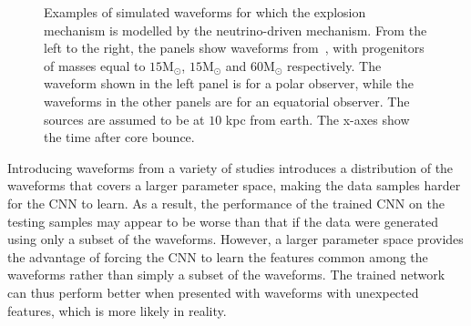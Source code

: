 \documentclass[aps,twocolumn,showpacs,groupedaddress, nofootinbib]{revtex4}  %
\begin{document}
%
%
\begin{figure}
     \begin{center}
        \quad
        \quad
    \end{center}
    \caption{Examples of simulated waveforms for which the explosion mechanism is
modelled by the neutrino-driven mechanism. From the left to the right, the
panels show waveforms from~\cite{10.1093mnrasstz990, 
radice2019characterizing, yakunin2017gravitational}, with progenitors of masses equal to
$15\text{M}_\odot$, $15\text{M}_\odot$ and $60\text{M}_\odot$ respectively.
The waveform shown in the left panel is for a polar observer, while the waveforms in the other panels are 
for an equatorial observer.
The sources are assumed to be at $10$ kpc from earth. The x-axes show the time after core bounce.
\label{fig:neuwaveforms}} 
\end{figure}
%
%
Introducing waveforms from a variety of studies introduces a distribution of
the waveforms that covers a larger parameter space, making the data samples
harder for the \ac{CNN} to learn. As a result, the performance of the trained
\ac{CNN} on the testing samples may appear to be worse than that if the data
were generated using only a subset of the waveforms. However, a larger
parameter space provides the advantage of forcing the \ac{CNN} to learn the
features common among the waveforms rather than simply a subset of the
waveforms.  The trained network can thus perform better when presented with
waveforms with unexpected features, which is more likely in reality.
\end{document}
